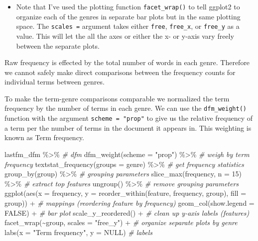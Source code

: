 \documentclass[
]{article}
\newenvironment{Shaded}{\begin{snugshade}}{\end{snugshade}}
\newcommand{\AttributeTok}[1]{\textcolor[rgb]{0.77,0.63,0.00}{#1}}
\newcommand{\CommentTok}[1]{\textcolor[rgb]{0.56,0.35,0.01}{\textit{#1}}}
\newcommand{\ConstantTok}[1]{\textcolor[rgb]{0.00,0.00,0.00}{#1}}
\newcommand{\DecValTok}[1]{\textcolor[rgb]{0.00,0.00,0.81}{#1}}
\newcommand{\FunctionTok}[1]{\textcolor[rgb]{0.00,0.00,0.00}{#1}}
\newcommand{\NormalTok}[1]{#1}
\newcommand{\SpecialCharTok}[1]{\textcolor[rgb]{0.00,0.00,0.00}{#1}}
\newcommand{\StringTok}[1]{\textcolor[rgb]{0.31,0.60,0.02}{#1}}
\newenvironment{rmdblock}[1]
  {\begin{shaded*}
  \begin{itemize}
  \renewcommand{\labelitemi}{
    \raisebox{-.5\height}[0pt][0pt]{
      {\setkeys{Gin}{width=2em,keepaspectratio}\texttt{[image: assets/images/\#1]}}
    }
  }
  \item
  }
  {
  \end{itemize}
  \end{shaded*}
  }
\newenvironment{rmdtip}
  {\begin{rmdblock}{tip}}
  {\end{rmdblock}}
\begin{document}
\begin{rmdtip}
Note that I've used the plotting function \texttt{facet\_wrap()} to tell
ggplot2 to organize each of the genres in separate bar plots but in the
same plotting space. The \texttt{scales\ =} argument takes either
\texttt{free}, \texttt{free\_x}, or \texttt{free\_y} as a value. This
will let the all the axes or either the x- or y-axis vary freely between
the separate plots.
\end{rmdtip}

Raw frequency is effected by the total number of words in each genre. Therefore we cannot safely make direct comparisons between the frequency counts for individual terms between genres.

To make the term-genre comparisons comparable we normalized the term frequency by the number of terms in each genre. We can use the \texttt{dfm\_weight()} function with the argument \texttt{scheme\ =\ "prop"} to give us the relative frequency of a term per the number of terms in the document it appears in. This weighting is known as Term frequency.

\begin{Shaded}
\begin{Highlighting}[]
\NormalTok{lastfm\_dfm }\SpecialCharTok{\%\textgreater{}\%} \CommentTok{\# dfm}
  \FunctionTok{dfm\_weight}\NormalTok{(}\AttributeTok{scheme =} \StringTok{"prop"}\NormalTok{) }\SpecialCharTok{\%\textgreater{}\%} \CommentTok{\# weigh by term frequency}
  \FunctionTok{textstat\_frequency}\NormalTok{(}\AttributeTok{groups =}\NormalTok{ genre) }\SpecialCharTok{\%\textgreater{}\%} \CommentTok{\# get frequency statistics}
  \FunctionTok{group\_by}\NormalTok{(group) }\SpecialCharTok{\%\textgreater{}\%} \CommentTok{\# grouping parameters}
  \FunctionTok{slice\_max}\NormalTok{(frequency, }\AttributeTok{n =} \DecValTok{15}\NormalTok{) }\SpecialCharTok{\%\textgreater{}\%} \CommentTok{\# extract top features}
  \FunctionTok{ungroup}\NormalTok{() }\SpecialCharTok{\%\textgreater{}\%} \CommentTok{\# remove grouping parameters}
  \FunctionTok{ggplot}\NormalTok{(}\FunctionTok{aes}\NormalTok{(}\AttributeTok{x =}\NormalTok{ frequency, }\AttributeTok{y =} \FunctionTok{reorder\_within}\NormalTok{(feature, frequency, group), }\AttributeTok{fill =}\NormalTok{ group)) }\SpecialCharTok{+} \CommentTok{\# mappings (reordering feature by frequency)}
  \FunctionTok{geom\_col}\NormalTok{(}\AttributeTok{show.legend =} \ConstantTok{FALSE}\NormalTok{) }\SpecialCharTok{+} \CommentTok{\# bar plot}
  \FunctionTok{scale\_y\_reordered}\NormalTok{() }\SpecialCharTok{+} \CommentTok{\# clean up y{-}axis labels (features)}
  \FunctionTok{facet\_wrap}\NormalTok{(}\SpecialCharTok{\textasciitilde{}}\NormalTok{group, }\AttributeTok{scales =} \StringTok{"free\_y"}\NormalTok{) }\SpecialCharTok{+} \CommentTok{\# organize separate plots by genre}
  \FunctionTok{labs}\NormalTok{(}\AttributeTok{x =} \StringTok{"Term frequency"}\NormalTok{, }\AttributeTok{y =} \ConstantTok{NULL}\NormalTok{) }\CommentTok{\# labels}
\end{Highlighting}
\end{Shaded}
\end{document}
